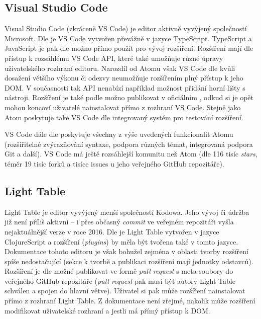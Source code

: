 \subsection{Visual Studio Code}

Visual Studio Code (zkráceně VS Code) je editor aktivně vyvýjený společností Microsoft. Dle \cite{vscode-docs} je VS
Code vytvořen převážně v jazyce TypeScript. TypeScript a JavaScript je pak dle \cite{vscode-docs} možno přímo použít pro
vývoj rozšíření. Rozšíření mají dle \cite{vscode-docs} přístup k rozsáhlému VS Code API, které také umožňuje různé
úpravy uživatelského rozhraní editoru. Narozdíl od Atomu však VS Code dle \cite{vscode-docs} kvůli dosažení většího
výkonu či odezvy neumožňuje rozšířením plný přístup k jeho DOM. V současnosti tak API \cite{vscode-docs} nenabízí
například možnost přidání horní lišty s nástroji. Rozšíření je také podle \cite{vscode-docs} možno publikovat v
oficiálním , odkud si je opět mohou koncoví uživatelé nainstalovat přímo z rozhraní VS Code. Stejně jako
Atom poskytuje také VS Code dle \cite{vscode-docs} integrovaný systém pro testování rozšíření.

VS Code dále dle \cite{vscode-docs} poskytuje všechny z výše uvedených funkcionalit Atomu (rozšiřitelné zvýrazňování
syntaxe, podpora různých témat, integrovaná podpora Git a další). VS Code má ještě rozsáhlejší komunitu než Atom (dle
\cite{vscode-github} 116 tisíc \textit{stars}, téměr 19 tisíc forků a tisíce issues u jeho veřejného GitHub repozitáře).

\subsection{Light Table}

Light Table je editor vyvýjený menší společností Kodowa. Jeho vývoj či údržba již není příliš aktivní – i přes občasný
\cite{light-table-github} \textit{commit} ve veřejném repozitáři vyšla nejaktuálnější verze v roce 2016. Dle \cite
{light-table-github} je Light Table vytvořen v jazyce ClojureScript a rozšíření (\textit{plugins}) by měla být tvořena
také v tomto jazyce. Dokumentace \cite{light-table-docs} tohoto editoru je však bohužel zejména v oblasti tvorby
rozšíření spíše nedostačující (sekce k tvorbě a publikaci rozšíření mají jednotky odstavců). Rozšíření je dle \cite
{light-table-docs} možné publikovat ve formě \textit{pull request} s meta-soubory do veřejného GitHub repozitáře
(\textit{pull request} pak musí být autory Light Table schválen a spojen do hlavní větve). Uživatel si pak může
rozšíření nainstalovat přímo z rozhraní Light Table. Z dokumentace \cite{light-table-docs} není zřejmé, nakolik může
rozšíření modifikovat uživatelské rozhraní a jestli má přímý přístup k DOM.

